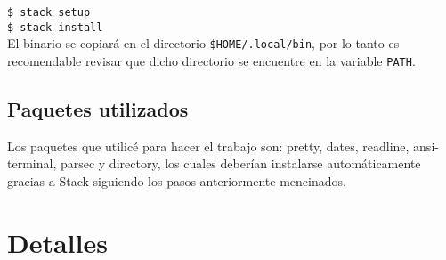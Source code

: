 \documentclass[a4paper]{article}
\begin{document}
\texttt{\$ stack setup}\\
\texttt{\$ stack install}\\

El binario se copiará en el directorio \texttt{\$HOME/.local/bin}, por lo tanto es recomendable revisar que dicho directorio se encuentre en la variable \texttt{PATH}.

\subsection*{Paquetes utilizados}
Los paquetes que utilicé para hacer el trabajo son: pretty, dates, readline, ansi-terminal, parsec y directory, los cuales deberían instalarse automáticamente gracias a Stack siguiendo los pasos anteriormente mencinados.

\section*{Detalles}
\end{document}
